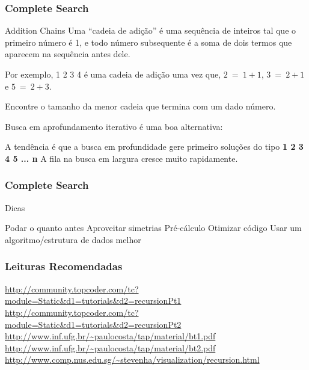\begin{frame}
\frametitle{Complete Search}
\begin{block}{Addition Chains}
Uma ``cadeia de adição'' é uma sequência de inteiros tal que o primeiro número é 1, e todo número subsequente é a soma de dois termos que aparecem na sequência antes dele.

Por exemplo, 1 2 3 4 é uma cadeia de adição uma vez que, $2\ =\ 1+1$, $3\ =\ 2+1$ e $5\ =\ 2+3$.
\begin{itemize}
	\bitem Encontre o tamanho da menor cadeia que termina com um dado número.
\end{itemize}
\end{block}
\pause
\begin{block}{}
\begin{itemize}
	\bitem Busca em aprofundamento iterativo é uma boa alternativa:
	\begin{itemize}
		\bitem A tendência é que a busca em profundidade gere primeiro soluções do tipo \textbf{1 2 3 4 5 ... n}
		\bitem A fila na busca em largura cresce muito rapidamente.
	\end{itemize}
\end{itemize}
\end{block}
\end{frame}

\begin{frame}
\frametitle{Complete Search}
\begin{block}{Dicas}
\begin{itemize}[<+->]
	\bitem Podar o quanto antes
	\bitem Aproveitar simetrias
	\bitem Pré-cálculo
	\bitem Otimizar código
	\bitem Usar um algoritmo/estrutura de dados melhor
\end{itemize}
\end{block}
\end{frame}

\begin{frame}
\frametitle{Leituras Recomendadas}

\begin{block}{}
\begin{itemize}
\scriptsize
	\bitem \url{http://community.topcoder.com/tc?module=Static&d1=tutorials&d2=recursionPt1}
	\bitem \url{http://community.topcoder.com/tc?module=Static&d1=tutorials&d2=recursionPt2}
	\bitem \url{http://www.inf.ufg.br/~paulocosta/tap/material/bt1.pdf}
	\bitem \url{http://www.inf.ufg.br/~paulocosta/tap/material/bt2.pdf}
	\bitem \url{http://www.comp.nus.edu.sg/~stevenha/visualization/recursion.html}
\end{itemize}
\end{block}

\end{frame}
